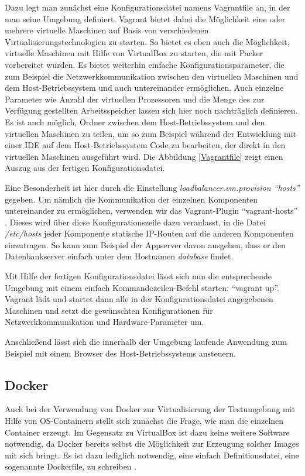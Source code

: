 Dazu legt man zunächst eine Konfigurationsdatei namens Vagrantfile an, in der man seine Umgebung definiert. Vagrant bietet dabei die Möglichkeit eine oder mehrere virtuelle Maschinen auf Basis von verschiedenen Virtualisierungstechnologien zu starten. So bietet es eben auch die Möglichkeit, virtuelle Maschinen mit Hilfe von VirtualBox zu starten, die mit Packer vorbereitet wurden. Es bietet weiterhin einfache Konfigurationsparameter, die zum Beispiel die Netzwerkkommunikation zwischen den virtuellen Maschinen und dem Host-Betriebssystem und auch untereinander ermöglichen. Auch einzelne Parameter wie Anzahl der virtuellen Prozessoren und die Menge des zur Verfügung gestellten Arbeitsspeicher lassen sich hier noch nachträglich definieren. Es ist auch möglich, Ordner zwischen dem Host-Betriebssystem und den virtuellen Maschinen zu teilen, um so zum Beispiel während der Entwicklung mit einer IDE auf dem Host-Betriebssystem Code zu bearbeiten, der direkt in den virtuellen Maschinen ausgeführt wird. Die Abbildung \ref{Vagrantfile} zeigt einen Auszug aus der fertigen Konfigurationsdatei.

Eine Besonderheit ist hier durch die Einstellung \textit{loadbalancer.vm.provision "`hosts"'} gegeben. Um nämlich die Kommunikation der einzelnen Komponenten untereinander zu ermöglichen, verwenden wir das Vagrant-Plugin "`vagrant-hosts"' \citep[Vgl.][]{vagranthosts}. Dieses wird über diese Konfigurationszeile dazu veranlasst, in die Datei \textit{/etc/hosts} jeder Komponente statische IP-Routen auf die anderen Komponenten einzutragen. So kann zum Beispiel der Appserver davon ausgehen, dass er den Datenbankserver einfach unter dem Hostnamen \textit{database} findet.

Mit Hilfe der fertigen Konfigurationsdatei lässt sich nun die entsprechende Umgebung mit einem einfach Kommandozeilen-Befehl starten: "`vagrant up"'. Vagrant lädt und startet dann alle in der Konfigurationsdatei angegebenen Maschinen und setzt die gewünschten Konfigurationen für Netzwerkkommunikation und Hardware-Parameter um.

Anschließend lässt sich die innerhalb der Umgebung laufende Anwendung zum Beispiel mit einem Browser des Host-Betriebssystems ansteuern.

\subsection{Docker}

Auch bei der Verwendung von Docker zur Virtualisierung der Testumgebung mit Hilfe von OS-Containern stellt sich zunächst die Frage, wie man die einzelnen Container erzeugt. Im Gegensatz zu VirtualBox ist dazu keine weitere Software notwendig, da Docker bereits selbst die Möglichkeit zur Erzeugung solcher Images mit sich bringt. Es ist dazu lediglich notwendig, eine einfach Definitionsdatei, eine sogenannte Dockerfile, zu schreiben \citep[Vgl.][]{docker:003}.

